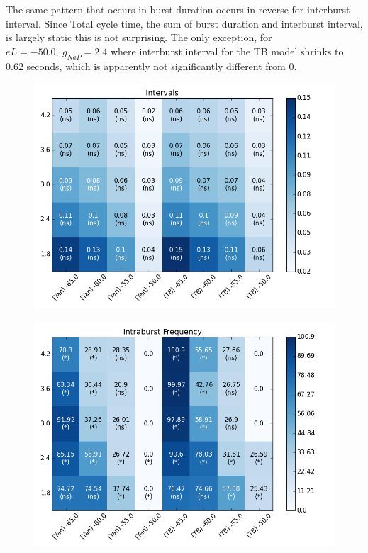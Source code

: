 \documentclass[11pt]{article}
\begin{document}
The same pattern that occurs in burst duration occurs in reverse for interburst interval. Since Total cycle time, the sum of burst duration and interburst interval, is largely static this is not surprising. The only exception, for $eL=-50.0,\ g_{NaP} = 2.4$ where interburst interval for the TB model shrinks to 0.62 seconds, which is apparently not significantly different from 0.
  
\begin{figure}
\begin{center}
\includegraphics[scale=.4]{heatmap_Intervals.png}
\end{center}
\end{figure}
 
 
 \begin{figure}
\begin{center}
\includegraphics[scale=.4]{heatmap_Intraburst_Frequency.png}
\end{center}
\end{figure}
 
\end{document}
